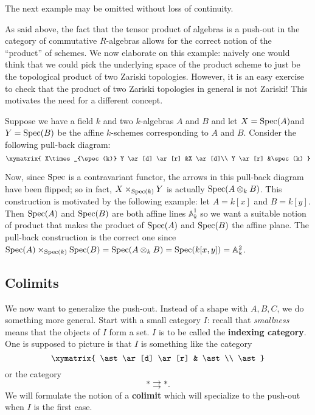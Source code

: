 \begin{example} The next example may
be omitted without loss of continuity.

As said above, the fact that the tensor product of algebras is
a push-out in the category of
commutative $R$-algebras allows for the correct notion of the ``product'' of
schemes. We now elaborate on this example: naively one would think that we
could pick the underlying space of the product scheme to just be the topological
product of two Zariski topologies. However, it is an easy exercise to check
that the product of two Zariski topologies in general is not Zariski! This
motivates
the need for a different concept.

Suppose we have a field $k$ and two $k$-algebras $A$ and $B$ and let
$X=\operatorname{Spec}(A)$and $Y=\operatorname{Spec}(B)$ be the affine $k$-schemes corresponding to $A$ and
$B$. Consider the following pull-back diagram:
\[
\xymatrix{
X\times_{\spec(k)} Y \ar[d] \ar[r] &X \ar[d]\\
Y \ar[r] &\spec(k) }\]

Now, since $\operatorname{Spec}$ is a contravariant functor, the arrows in this pull-back
diagram have been flipped; so in fact, $X\times_{\operatorname{Spec}(k)} Y$ is actually
$\operatorname{Spec}(A\otimes _k B)$. This construction is motivated by the following example:
let $A=k[x]$ and $B=k[y]$. Then $\operatorname{Spec}(A)$ and $\operatorname{Spec}(B)$ are both affine lines
$\mathbb{A}^1_k$ so we want a suitable notion of product that makes the product
of $\operatorname{Spec}(A)$ and $\operatorname{Spec}(B)$ the affine plane. The pull-back construction is the
correct one since $\operatorname{Spec}(A)\times_{\operatorname{Spec}(k)} \operatorname{Spec}(B)=\operatorname{Spec}(A\otimes_k
B)=\operatorname{Spec}(k[x,y])=\mathbb{A}^2_k$.
\end{example}


\subsection{Colimits}


We now want to generalize the push-out.
Instead of a shape with $A,B,C$, we do something more general.
Start with a small category $I$: recall that \emph{smallness} means that the objects of $I$
form a set. $I$ is to be called  the  \textbf{indexing
category}. One is supposed to picture
is that $I$ is something like the category
\[
\xymatrix{
\ast \ar[d] \ar[r] &  \ast \\
\ast
}
\]
or the category
\[ \ast \rightrightarrows \ast.  \]
We will formulate the notion of a \textbf{colimit} which will specialize to the
push-out when $I$ is the first case. 


